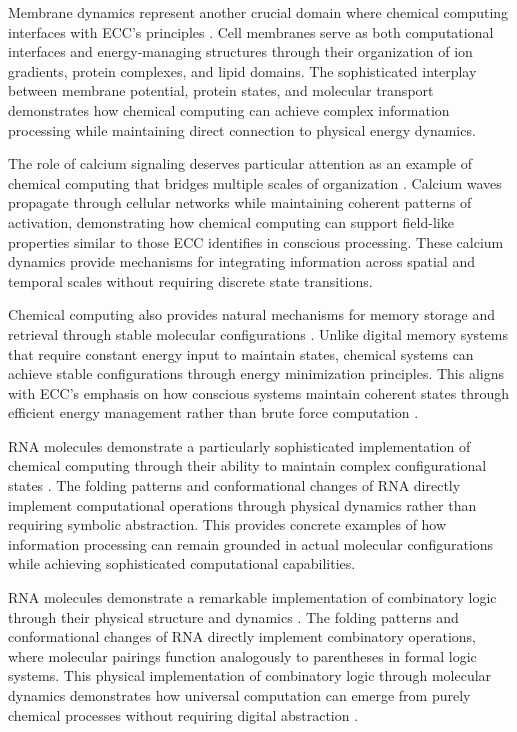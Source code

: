Membrane dynamics represent another crucial domain where chemical computing interfaces with ECC's principles \cite{Magnasco1997}. Cell membranes serve as both computational interfaces and energy-managing structures through their organization of ion gradients, protein complexes, and lipid domains. The sophisticated interplay between membrane potential, protein states, and molecular transport demonstrates how chemical computing can achieve complex information processing while maintaining direct connection to physical energy dynamics.

The role of calcium signaling deserves particular attention as an example of chemical computing that bridges multiple scales of organization \cite{Prakash2007}. Calcium waves propagate through cellular networks while maintaining coherent patterns of activation, demonstrating how chemical computing can support field-like properties similar to those ECC identifies in conscious processing. These calcium dynamics provide mechanisms for integrating information across spatial and temporal scales without requiring discrete state transitions.

Chemical computing also provides natural mechanisms for memory storage and retrieval through stable molecular configurations \cite{Qian2011, gershman2023molecular}. Unlike digital memory systems that require constant energy input to maintain states, chemical systems can achieve stable configurations through energy minimization principles. This aligns with ECC's emphasis on how conscious systems maintain coherent states through efficient energy management rather than brute force computation \cite{Soloveichik2010}.

RNA molecules demonstrate a particularly sophisticated implementation of chemical computing through their ability to maintain complex configurational states \cite{Wang2021}. The folding patterns and conformational changes of RNA directly implement computational operations through physical dynamics rather than requiring symbolic abstraction. This provides concrete examples of how information processing can remain grounded in actual molecular configurations while achieving sophisticated computational capabilities.

RNA molecules demonstrate a remarkable implementation of combinatory logic through their physical structure and dynamics \cite{Adamatzky2021,akhlaghpour2022rna}. The folding patterns and conformational changes of RNA directly implement combinatory operations, where molecular pairings function analogously to parentheses in formal logic systems. This physical implementation of combinatory logic through molecular dynamics demonstrates how universal computation can emerge from purely chemical processes without requiring digital abstraction \cite{Hjelmfelt1991}.

